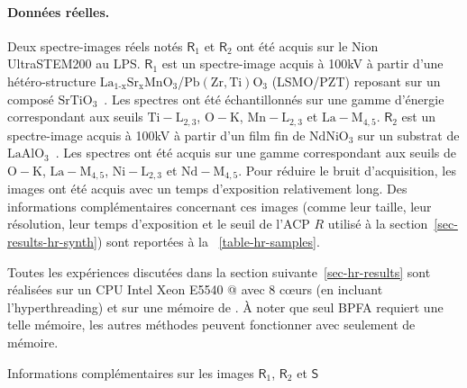 \paragraph{Données réelles.} Deux spectre-images réels notés $\mathsf{R}_1$ et $\mathsf{R}_2$ ont été acquis sur le Nion UltraSTEM200 au LPS. 
%
$\mathsf{R}_1$ est un spectre-image acquis à 100\;kV à partir d'une hétéro-structure $\mathrm{La}_{1‐\mathrm{x}}\mathrm{Sr}_{\mathrm{x}}\mathrm{MnO}_3$/$\mathrm{Pb}(\mathrm{Zr,Ti})\mathrm{O}_3$ (LSMO/PZT) reposant sur un composé $\mathrm{SrTiO}_3$~\cite{li2016charge}. Les spectres ont été échantillonnés sur une gamme d'énergie correspondant aux seuils $\mathrm{Ti-L}_{2,3}$, $\mathrm{O-K}$, $\mathrm{Mn -L}_{2,3}$ et $\mathrm{La-M}_{4,5}$.
%
$\mathsf{R}_2$ est un spectre-image acquis à 100\;kV à partir d'un film fin de $\mathrm{NdNiO}_3$ sur un substrat de $\mathrm{LaAlO}_3$~\cite{preziosi2018direct}. Les spectres ont été acquis sur une gamme correspondant aux seuils de $\mathrm{O-K}$, $\mathrm{La-M}_{4,5}$, $\mathrm{Ni-L}_{2,3}$ et $\mathrm{Nd-M}_{4,5}$.
%
Pour réduire le bruit d'acquisition, les images ont été acquis avec un temps d'exposition relativement long. Des informations complémentaires concernant ces images (comme leur taille, leur résolution, leur temps d'exposition et le seuil de l'ACP $R$ utilisé à la section~\ref{sec-results-hr-synth}) sont reportées à la \tabname~\ref{table-hr-samples}.

Toutes les expériences discutées dans la section suivante~\ref{sec-hr-results} sont réalisées sur un CPU Intel Xeon E5540 @  avec 8 c\oe{}urs (en incluant l'hyperthreading) et sur une mémoire de . \`A noter que seul BPFA requiert une telle mémoire, les autres méthodes peuvent fonctionner avec seulement  de mémoire.

\begin{table}
    \centering
    
    \caption{Informations complémentaires sur les images $\mathsf{R}_1$, $\mathsf{R}_2$ et $\mathsf{S}$
        \protect\label{table-hr-samples}
    }
\end{table}

